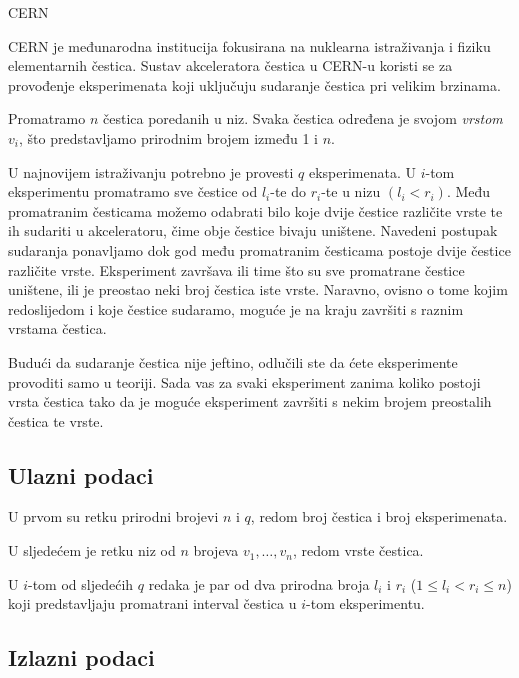 \begin{statement}[
  problempoints=100,
  timelimit=1.5 sekunda,
  memorylimit=512 MiB,
]{CERN}

CERN je međunarodna institucija fokusirana na nuklearna istraživanja i fiziku elementarnih čestica. 
Sustav akceleratora čestica u CERN-u koristi se za provođenje eksperimenata koji uključuju sudaranje čestica pri velikim brzinama. 

Promatramo $n$ čestica poredanih u niz. Svaka čestica određena je svojom \textit{vrstom} $v_i$, što 
predstavljamo prirodnim brojem između 1 i $n$. 

U najnovijem istraživanju potrebno je provesti $q$ eksperimenata. U $i$-tom eksperimentu 
promatramo sve čestice od $l_i$-te do $r_i$-te u nizu $(l_i < r_i)$. Među promatranim česticama 
možemo odabrati bilo koje dvije čestice različite vrste te ih sudariti u akceleratoru, čime obje 
čestice bivaju uništene. Navedeni postupak sudaranja ponavljamo dok god među promatranim česticama 
postoje dvije čestice različite vrste. Eksperiment završava ili time što su sve promatrane čestice 
uništene, ili je preostao neki broj čestica iste vrste. Naravno, ovisno o tome kojim redoslijedom i 
koje čestice sudaramo, moguće je na kraju završiti s raznim vrstama čestica. 

Budući da sudaranje čestica nije jeftino, 
odlučili ste da ćete eksperimente provoditi samo u teoriji. Sada vas za svaki eksperiment zanima 
koliko postoji vrsta čestica tako da je moguće eksperiment završiti s nekim brojem preostalih 
čestica te vrste. 

\subsection*{Ulazni podaci}

U prvom su retku prirodni brojevi $n$ i $q$, redom broj čestica i broj eksperimenata.

U sljedećem je retku niz od $n$ brojeva $v_1, \dots, v_n$, redom vrste čestica. 

U $i$-tom od sljedećih $q$ redaka je par od dva prirodna broja $l_i$ i $r_i$ 
($1 \leq l_i < r_i \leq n$) koji predstavljaju promatrani interval čestica u $i$-tom eksperimentu.  

\subsection*{Izlazni podaci}


\end{statement}
